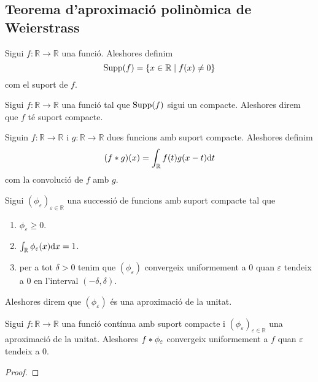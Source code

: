 \documentclass[../Apunts.tex]{subfiles}
\begin{document}
	\subsection{Teorema d'aproximació polinòmica de Weierstrass}
	\begin{definition}
		\label{def:suport d'una funció}
		Sigui \(f\colon\mathbb{R}\longrightarrow\mathbb{R}\) una funció. Aleshores definim
		\[\operatorname*{Supp}(f)=\{x\in\mathbb{R}\mid f(x)\neq0\}\]
		com el suport de \(f\).
	\end{definition}
	\begin{definition}
		\label{def:funció amb suport compacte}
		Sigui \(f\colon\mathbb{R}\longrightarrow\mathbb{R}\) una funció tal que \(\operatorname*{Supp}(f)\) sigui un compacte. Aleshores direm que \(f\) té suport compacte.
	\end{definition}
	\begin{definition}[Convolució]
		\label{def:convolució de dues funcions}
		Siguin \(f\colon\mathbb{R}\longrightarrow\mathbb{R}\) i \(g\colon\mathbb{R}\longrightarrow\mathbb{R}\) dues funcions amb suport compacte. Aleshores definim
		\[(f\ast g)(x)=\int_{\mathbb{R}}f(t)g(x-t)\mathrm{d} t\]
		com la convolució de \(f\) amb \(g\).
	\end{definition}
	\begin{definition}
		\label{def:aproximació de la unitat}
		Sigui \((\phi_{\varepsilon})_{\varepsilon\in\mathbb{R}}\) una successió de funcions amb suport compacte tal que
		\begin{enumerate}
			\item \(\phi_{\varepsilon}\geq0\).
			\item \(\int_{\mathbb{R}}\phi_{\varepsilon}(x)\mathrm{d} x=1\).
			\item per a tot \(\delta>0\) tenim que \((\phi_{\varepsilon})\) convergeix uniformement a \(0\) quan \(\varepsilon\) tendeix a \(0\) en l'interval \((-\delta,\delta)\).
		\end{enumerate}
		Aleshores direm que \((\phi_{\varepsilon})\) és una aproximació de la unitat.
	\end{definition}
	\begin{lemma}
		\label{lema:Teorema d'aproximació polinòmica de Weierstrass}
		Sigui \(f\colon\mathbb{R}\longrightarrow\mathbb{R}\) una funció contínua amb suport compacte i \((\phi_{\varepsilon})_{\varepsilon\in\mathbb{R}}\) una aproximació de la unitat. Aleshores \(f\ast\phi_{\varepsilon}\) convergeix uniformement a \(f\) quan \(\varepsilon\) tendeix a \(0\).
		\begin{proof}
		\end{proof}
	\end{lemma}
\end{document}
